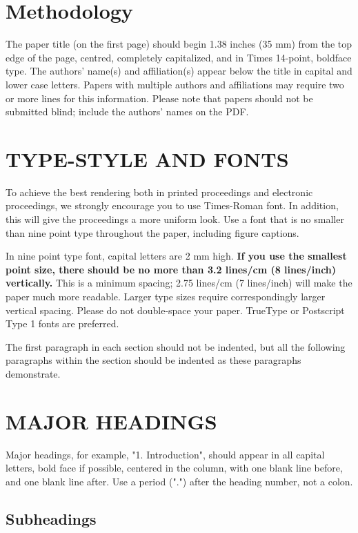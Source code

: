 \documentclass{article}
\begin{document}
\section{Methodology}
\label{sec:pagestyle}

The paper title (on the first page) should begin 1.38 inches (35 mm) from the
top edge of the page, centred, completely capitalized, and in Times 14-point,
boldface type.  The authors' name(s) and affiliation(s) appear below the title
in capital and lower case letters.  Papers with multiple authors and
affiliations may require two or more lines for this information. Please note
that papers should not be submitted blind; include the authors' names on the
PDF.

\section{TYPE-STYLE AND FONTS}
\label{sec:typestyle}

To achieve the best rendering both in printed proceedings and electronic proceedings, we
strongly encourage you to use Times-Roman font.  In addition, this will give
the proceedings a more uniform look.  Use a font that is no smaller than nine
point type throughout the paper, including figure captions.

In nine point type font, capital letters are 2 mm high.  {\bf If you use the
smallest point size, there should be no more than 3.2 lines/cm (8 lines/inch)
vertically.}  This is a minimum spacing; 2.75 lines/cm (7 lines/inch) will make
the paper much more readable.  Larger type sizes require correspondingly larger
vertical spacing.  Please do not double-space your paper.  TrueType or
Postscript Type 1 fonts are preferred.

The first paragraph in each section should not be indented, but all the
following paragraphs within the section should be indented as these paragraphs
demonstrate.

\section{MAJOR HEADINGS}
\label{sec:majhead}

Major headings, for example, "1. Introduction", should appear in all capital
letters, bold face if possible, centered in the column, with one blank line
before, and one blank line after. Use a period (".") after the heading number,
not a colon.

\subsection{Subheadings}
\label{ssec:subhead}
\end{document}
